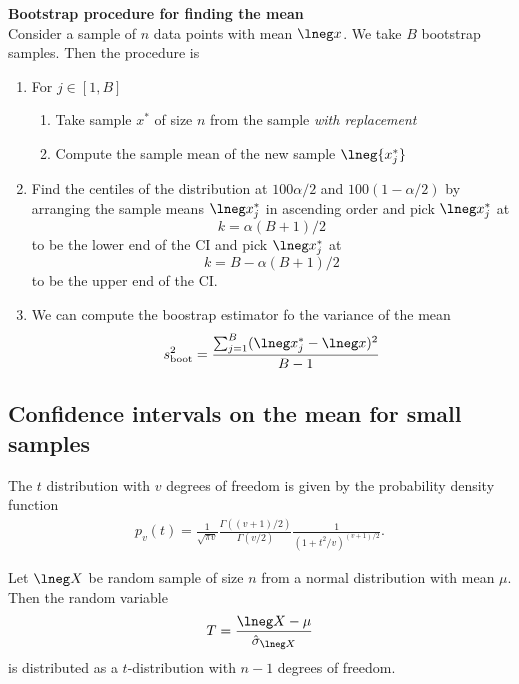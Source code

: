 \documentclass{article}
\begin{document}
\textbf{Bootstrap procedure for finding the mean}\\
Consider a sample of $n$ data points with mean
$\lneg x$. We take $B$ bootstrap samples.
Then the procedure is
\begin{enumerate}
	\item For $j\in[1,B]$ \begin{enumerate}
		\item Take sample $x^*$ of size $n$ from the sample \emph{with replacement}
		\item Compute the sample mean of the new sample $\lneg{x_j^*}$
	\end{enumerate} 
	\item Find the centiles of the distribution at $100\alpha/2$ and $100(1-\alpha/2)$
		  by arranging the sample means $\lneg x^*_j$ in ascending order and pick
		  $\lneg x^*_j$ at $$k=\alpha(B+1)/2$$ to be the lower end of the CI and pick
		  $\lneg x^*_j$ at $$k=B-\alpha(B+1)/2$$ to be the upper end of the CI.
    \item We can compute the boostrap estimator fo the variance of the mean \begin{align*}
		s^2_{\text{boot}} = \frac{\sum_{j=1}^B(\lneg x_j^*-\lneg x)^2}{B-1}
	\end{align*}
\end{enumerate}

\subsection{Confidence intervals on the mean for small samples}

\begin{definition}
	The $t$ distribution with $v$ degrees of freedom is given by the
	probability density function
	\begin{align*}
		p_v(t)=\frac{1}{\sqrt{\pi v}}\frac{\Gamma((v+1)/2)}{\Gamma(v/2)}\frac{1}{(1+t^2/v)^{(v+1)/2}}.
	\end{align*}
\end{definition}

\begin{theorem}
	Let $\lneg X$ be random sample of size $n$ from a normal distribution
	with mean $\mu$. Then the random variable
	\begin{align*}
		T=\frac{\lneg X - \mu}{\hat\sigma_{\lneg X}}
	\end{align*}
	is distributed as a $t$-distribution with $n-1$ degrees of freedom.
\end{theorem}
\end{document}
